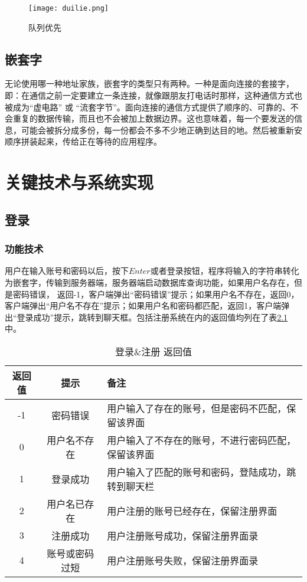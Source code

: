 \documentclass[forprint]{sql}
\begin{document}
\begin{figure}[ht]
	\centering
	\texttt{[image: duilie.png]}
	\caption{队列优先}
	\label{fig:12}
\end{figure}

\section{嵌套字}

无论使用哪一种地址家族，嵌套字的类型只有两种。一种是面向连接的套接字，即：在通信之前一定要建立一条连接，就像跟朋友打电话时那样，这种通信方式也被成为“虚电路” 或 “流套字节”。面向连接的通信方式提供了顺序的、可靠的、不会重复的数据传输，而且也不会被加上数据边界。这也意味着，每一个要发送的信息，可能会被拆分成多份，每一份都会不多不少地正确到达目的地。然后被重新安顺序拼装起来，传给正在等待的应用程序。
\clearpage
\chapter{关键技术与系统实现}

\section{登录}

\subsection{功能技术}

用户在输入账号和密码以后，按下$Enter$或者登录按钮，程序将输入的字符串转化为嵌套字，传输到服务器端，服务器端启动数据库查询功能，如果用户名存在，但是密码错误，
返回-1，客户端弹出“密码错误”提示；如果用户名不存在，返回0，客户端弹出“用户名不存在”提示；如果用户名和密码都匹配，返回1，客户端弹出“登录成功”提示，跳转到聊天框。包括注册系统在内的返回值均列在了表\ref{table:3}中。

\begin{table}[ht]
	\caption{登录\&注册 返回值}
	\label{table:3}
	\begin{tabular}{ccl}
		\hline
		返回值 & 提示     & 备注                         \\ \hline
		-1  & 密码错误   & 用户输入了存在的账号，但是密码不匹配，保留该界面   \\
		0   & 用户名不存在 & 用户输入了不存在的账号，不进行密码匹配，保留该界面  \\
		1   & 登录成功   & 用户输入了匹配的账号和密码，登陆成功，跳转到聊天栏  \\
		2   & 用户名已存在 & 用户注册的账号已经存在，保留注册界面         \\
		3   & 注册成功   & 用户注册账号成功，保留注册界面录 \\
		4   & 账号或密码过短   & 用户注册账号失败，保留注册界面录 \\ \hline
	\end{tabular}
\end{table}
\end{document}
